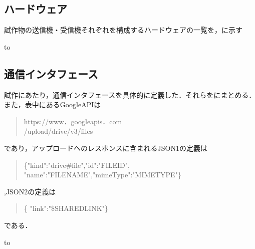 \documentclass[submit,techrep,noauthor]{ipsj}
\begin{document}
\subsection{ハードウェア}
試作物の送信機・受信機それぞれを構成するハードウェアの一覧を，に示す

\begin{table}[tb] 
\caption{試作物のハードウェア一覧} 
\label{tab:proto-hardwares}
\hbox to
\end{table}

\subsection{通信インタフェース}
試作にあたり，通信インタフェースを具体的に定義した．それらをにまとめる．また，表中にあるGoogleAPIは
\begin{quote}
    https://www．googleapis．com\\/upload/drive/v3/files
\end{quote}であり，アップロードへのレスポンスに含まれるJSON1の定義は\begin{quote}
    \{"kind":"drive\#file","id":"FILEID", "name":"FILENAME","mimeType":"MIMETYPE"\}
\end{quote},JSON2の定義は\begin{quote}
    \{ "link":"\$SHAREDLINK"\}
\end{quote}である．

\begin{table}[tb] 
\caption{試作物の通信インタフェース} 
\label{tab:proto-communication}
\hbox to
\end{table}
\end{document}
